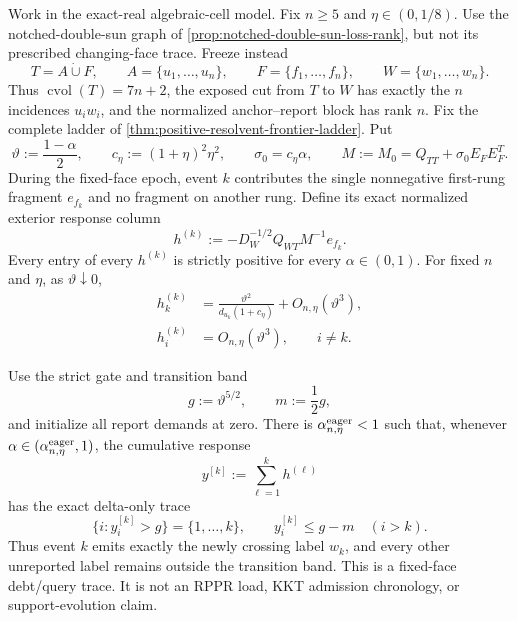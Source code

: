 \begin{proposition}
\label{prop:notched-sun-eager-slack-vector-obstruction}
Work in the exact-real algebraic-cell model.  Fix $n\geq5$ and
$\eta\in(0,1/8)$.  Use the notched-double-sun graph of
\cref{prop:notched-double-sun-loss-rank}, but not its prescribed changing-face
trace.  Freeze instead
\begin{equation*}
 T=A\mathbin{\dot\cup}F,
 \qquad
 A=\{u_1,\ldots,u_n\},
 \qquad
 F=\{f_1,\ldots,f_n\},
 \qquad
 W=\{w_1,\ldots,w_n\}.
\end{equation*}
Thus $\operatorname{cvol}(T)=7n+2$, the exposed cut from $T$ to $W$ has
exactly the $n$ incidences $u_iw_i$, and the normalized anchor--report block
has rank $n$.  Fix the complete ladder of
\cref{thm:positive-resolvent-frontier-ladder}.  Put
\begin{equation*}
 \vartheta:=\frac{1-\alpha}{2},
 \qquad
 c_\eta:=(1+\eta)^2\eta^2,
 \qquad
 \sigma_0=c_\eta\alpha,
 \qquad
 M:=M_0=Q_{TT}+\sigma_0E_FE_F^T.
\end{equation*}
During the fixed-face epoch, event $k$ contributes the single nonnegative
first-rung fragment $e_{f_k}$ and no fragment on another rung.  Define its
exact normalized exterior response column
\begin{equation}
 h^{(k)}:=-D_W^{-1/2}Q_{WT}M^{-1}e_{f_k}.
 \label{eq:notched-sun-frozen-response-column}
\end{equation}
Every entry of every $h^{(k)}$ is strictly positive for every
$\alpha\in(0,1)$.  For fixed $n$ and $\eta$, as
$\vartheta\downarrow0$,
\begin{align}
 h_k^{(k)}
 &=\frac{\vartheta^2}{d_{u_k}(1+c_\eta)}
   +O_{n,\eta}(\vartheta^3),
 \label{eq:notched-sun-frozen-matching-response}\\
 h_i^{(k)}&=O_{n,\eta}(\vartheta^3),
 \qquad i\neq k.
 \label{eq:notched-sun-frozen-off-response}
\end{align}

Use the strict gate and transition band
\begin{equation}
 g:=\vartheta^{5/2},
 \qquad
 m:=\frac12g,
 \label{eq:notched-sun-frozen-gate-band}
\end{equation}
and initialize all report demands at zero.  There is
$\alpha_{n,\eta}^{\rm eager}<1$ such that, whenever
$\alpha\in(\alpha_{n,\eta}^{\rm eager},1)$, the cumulative response
\begin{equation*}
 y^{[k]}:=\sum_{\ell=1}^kh^{(\ell)}
\end{equation*}
has the exact delta-only trace
\begin{equation}
 \{i:y_i^{[k]}>g\}=\{1,\ldots,k\},
 \qquad
 y_i^{[k]}\leq g-m\quad(i>k).
 \label{eq:notched-sun-frozen-delta-trace}
\end{equation}
Thus event $k$ emits exactly the newly crossing label $w_k$, and every other
unreported label remains outside the transition band.  This is a fixed-face
debt/query trace.  It is not an RPPR load, KKT admission chronology, or
support-evolution claim.


\end{proposition}
